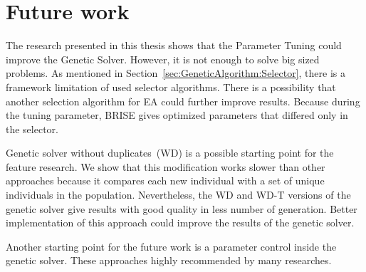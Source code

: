 \chapter{Future work}
\label{chapter:futureWork}

The research presented in this thesis shows that the Parameter Tuning could improve the Genetic Solver. However, it is not enough to solve big sized problems. As mentioned in Section~\ref{sec:GeneticAlgorithm:Selector}, there is a framework limitation of used selector algorithms. There is a possibility that another selection algorithm for EA could further improve results. Because during the tuning parameter, BRISE gives optimized parameters that differed only in the selector.

Genetic solver without duplicates~(WD) is a possible starting point for the feature research. We show that this modification works slower than other approaches because it compares each new individual with a set of unique individuals in the population. Nevertheless, the WD and WD-T versions of the genetic solver give results with good quality in less number of generation. Better implementation of this approach could improve the results of the genetic solver.

Another starting point for the future work is a parameter control inside the genetic solver. These approaches highly recommended by many researches. 